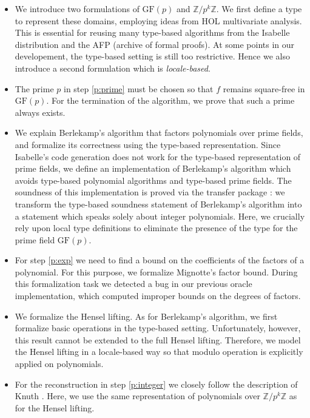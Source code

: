 \documentclass[11pt,a4paper]{article}
\newcommand\ints{\mathbb{Z}}
\newcommand\GFpp[1]{\ensuremath{\text{GF}(#1)}}
\newcommand\GFp{\GFpp{p}}
\newcommand\ring[1][p^k]{\ensuremath{\ints/{#1}\ints}\xspace}
\begin{document}
\begin{itemize}
\item
  We introduce two formulations of $\GFp$ and $\ring$.
  We first define a 
  type to represent these domains, 
  employing ideas from HOL multivariate analysis. 
  This is essential
  for reusing many type-based algorithms from the Isabelle distribution
  and the AFP (archive of formal proofs).
  At some points in our developement,
  the type-based setting is still too restrictive.
  Hence we also introduce a second formulation which is \emph{locale-based}.

\item The prime $p$ in step \ref{p:prime} must be chosen so that $f$ remains square-free
  in $\GFp$.
  For the termination of the algorithm, we prove that such a prime always
  exists. 

\item
  We explain Berlekamp's algorithm that factors polynomials over prime fields,
  and formalize its correctness using the type-based representation.
  Since Isabelle's code generation does not work for the type-based representation of prime fields,
  we define an implementation of Berlekamp's algorithm which avoids
  type-based polynomial algorithms and type-based prime fields.
  The soundness of this implementation is proved via the transfer package \cite{lifting}:
  we transform the type-based soundness statement of Berlekamp's algorithm
  into a statement which speaks solely about integer polynomials.
  Here, we crucially rely upon local type definitions 
  \cite{KP16} to eliminate the presence of the type for the prime field $\GFp$.
    
\item For step \ref{p:exp} we need to find a bound on the coefficients of 
  the factors of a polynomial.
  For this purpose, we formalize Mignotte's factor bound.
  During this formalization task
  we detected a bug in our previous oracle implementation,
  which computed improper bounds on the degrees of factors.
  
\item We formalize the Hensel lifting.
  As for Berlekamp's algorithm,
  we first formalize basic operations in the type-based setting.
  Unfortunately, however, this result cannot be extended to the full Hensel lifting.
  Therefore, we model the Hensel lifting in a locale-based way so that
  modulo operation is explicitly applied on polynomials.
  
\item For the reconstruction in step \ref{p:integer} we closely
  follow the description of Knuth \cite[page~452]{Knuth}. Here, we use the same
  representation of polynomials over $\ring$ as for the Hensel lifting.
  


\end{itemize}
\end{document}
